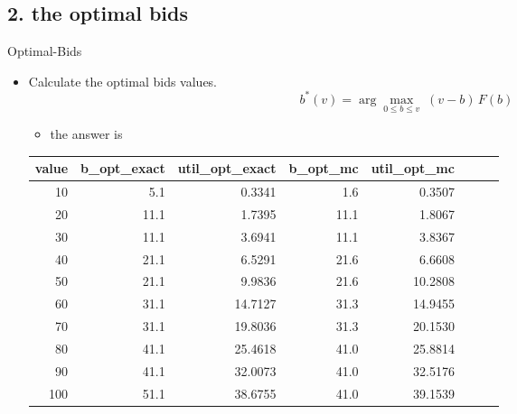 \documentclass{beamer}
\begin{document}
\subsection{2. the optimal bids}
\begin{frame}{Optimal-Bids}
\begin{itemize}
    \item Calculate the optimal bids values.
    \[b^{*}(v)=\arg\max_{0\le b\le v}\; (v - b)\,F(b)\]
    \begin{itemize}
        \item the answer is 
    \end{itemize} 
        {\small
        \begin{center}
        \begin{tabular}{@{}rrrrrrrr@{}}
        \toprule
        value & b\_opt\_exact & util\_opt\_exact & b\_opt\_mc & util\_opt\_mc \\
        \midrule
        10  &  5.1 &  0.3341 &  1.6 &  0.3507 \\
        20  & 11.1 &  1.7395 & 11.1 &  1.8067 \\
        30  & 11.1 &  3.6941 & 11.1 &  3.8367 \\
        40  & 21.1 &  6.5291 & 21.6 &  6.6608 \\
        50  & 21.1 &  9.9836 & 21.6 & 10.2808 \\
        60  & 31.1 & 14.7127 & 31.3 & 14.9455 \\
        70  & 31.1 & 19.8036 & 31.3 & 20.1530 \\
        80  & 41.1 & 25.4618 & 41.0 & 25.8814 \\
        90  & 41.1 & 32.0073 & 41.0 & 32.5176 \\
        100 & 51.1 & 38.6755 & 41.0 & 39.1539 \\
        \bottomrule
        \end{tabular}
        \end{center}}
\end{itemize}
\end{frame}
\end{document}
